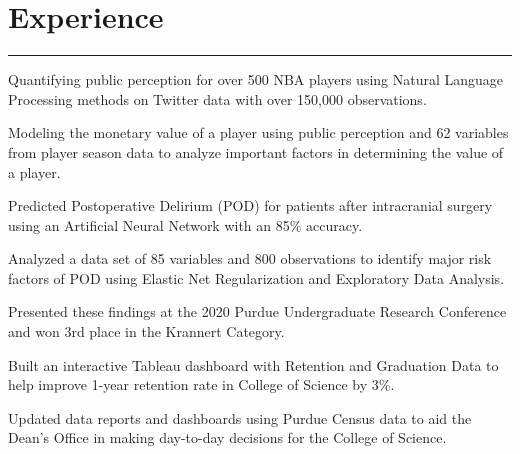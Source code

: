 \documentclass[]{sahana}
\begin{document}
\hfill
\begin{minipage}[t]{0.66\textwidth} 
\vspace{-1pt}
\section{Experience}
\noindent\rule{12.5cm}{0.4pt}
\vspace{-4pt}
\noindent
\begin{tightemize}
\item Quantifying public perception for over 500 NBA players using Natural Language Processing methods on Twitter data with over 150,000 observations.
\item Modeling the monetary value of a player using public perception and 62 variables from player season data to analyze important factors in determining the value of a player.
\end{tightemize}
\sectionsep

\vspace{-4pt}
\noindent
\begin{tightemize}
\vspace{-5pt}
\item Predicted Postoperative Delirium (POD) for patients after intracranial surgery using an Artificial Neural Network with an 85\% accuracy.
\item Analyzed a data set of 85 variables and 800 observations to identify major risk factors of POD using Elastic Net Regularization and Exploratory Data Analysis.
\item Presented these findings at the 2020 Purdue Undergraduate Research Conference and won 3rd place in the Krannert Category.
\end{tightemize}
\sectionsep

\vspace{-4pt}
\noindent
\begin{tightemize}
\vspace{-6pt}
\item Built an interactive Tableau dashboard with Retention and Graduation Data to help improve 1-year retention rate in College of Science by 3\%.
\item Updated data reports and dashboards using Purdue Census data to aid the Dean's Office in making day-to-day decisions for the College of Science.
\end{tightemize}
\sectionsep


\end{minipage}
\end{document}
